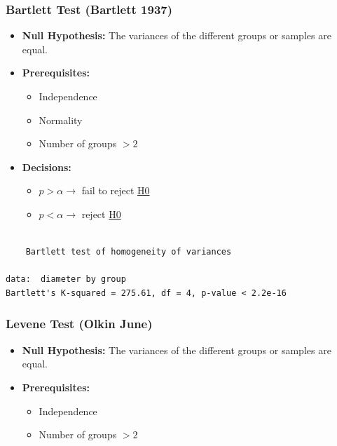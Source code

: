 \documentclass[
  a4paper,
]{scrbook}
\providecommand{\tightlist}{%
  \setlength{\itemsep}{0pt}\setlength{\parskip}{0pt}}\usepackage{longtable,booktabs,array}
\begin{document}
\subsubsection{Bartlett Test (Bartlett 1937)}\label{sec-bartlett}

\begin{itemize}
\tightlist
\item
  \textbf{Null Hypothesis:} The variances of the different groups or
  samples are equal.
\item
  \textbf{Prerequisites:}

  \begin{itemize}
  \tightlist
  \item
    Independence
  \item
    Normality
  \item
    Number of groups \(> 2\)
  \end{itemize}
\end{itemize}

\begin{itemize}
\tightlist
\item
  \textbf{Decisions:}

  \begin{itemize}
  \tightlist
  \item
    \(p> \alpha \rightarrow\) fail to reject \hyperref[H0]{H0}
  \item
    \(p< \alpha \rightarrow\) reject \hyperref[H0]{H0}
  \end{itemize}
\end{itemize}

\begin{verbatim}

    Bartlett test of homogeneity of variances

data:  diameter by group
Bartlett's K-squared = 275.61, df = 4, p-value < 2.2e-16
\end{verbatim}

\subsubsection{Levene Test (Olkin
June)}\label{levene-test-0-8047-0596-8}

\begin{itemize}
\tightlist
\item
  \textbf{Null Hypothesis:} The variances of the different groups or
  samples are equal.
\item
  \textbf{Prerequisites:}

  \begin{itemize}
  \tightlist
  \item
    Independence
  \item
    Number of groups \(> 2\)
  \end{itemize}
\end{itemize}
\end{document}
